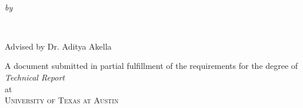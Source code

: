 \begin{titlepage}
  \vspace*{5cm}
  \makeatletter
  \begin{center}
    \begin{Huge}
      \@title
    \end{Huge}\\
    \begin{Large}
      \@subtitle
    \end{Large}
    \emph{by}\\
    \begin{Large}
        \@author\\
    \end{Large}
    \begin{Large}
        \vspace{5mm}
        Advised by Dr. Aditya Akella
    \end{Large}
    \vfill
    A document submitted in partial fulfillment
    of the requirements for the degree of\\
    \emph{Technical Report}\\
    at\\
    \textsc{University of Texas at Austin}
  \end{center}
  \makeatother
\end{titlepage}


